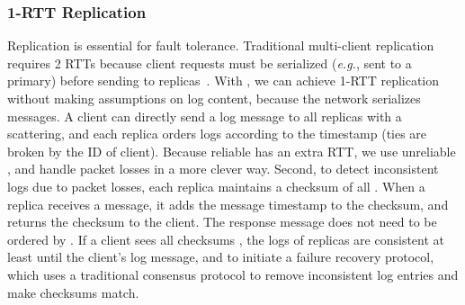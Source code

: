 \subsubsection{1-RTT Replication}
\label{sec:replication}


Replication is essential for fault tolerance.
Traditional multi-client replication requires 2 RTTs because client requests must be serialized (\textit{e.g.}, sent to a primary) before sending to replicas~\cite{park2019exploiting}.
With \sys{}, we can achieve 1-RTT replication without making assumptions on log content, because the network serializes messages.
A client can directly send a log message to all replicas with a scattering, and each replica orders logs according to the timestamp (ties are broken by the ID of client).
Because reliable \sys{} has an extra RTT, we use unreliable \sys{}, and handle packet losses  in a more clever way.
Second, to detect inconsistent logs due to packet losses, each replica maintains a checksum of all .
When a replica receives a message, it adds the message timestamp to the checksum, and returns the checksum to the client. The response message does not need to be ordered by \sys{}.
If a client sees all checksums , the logs of replicas are consistent at least until the client's log message, and 
 to initiate a failure recovery protocol, which uses a traditional consensus protocol to remove inconsistent log entries and make checksums match.



